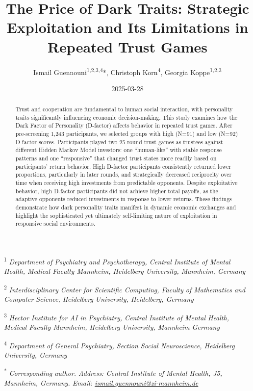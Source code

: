 \documentclass[
]{article}
\title{The Price of Dark Traits: Strategic Exploitation and Its Limitations in Repeated Trust Games}
\author{Ismail Guennouni\textsuperscript{1,2,3,4}*, Christoph Korn\textsuperscript{4}, Georgia Koppe\textsuperscript{1,2,3}}
\date{2025-03-28}
\begin{document}
\maketitle
\begin{abstract}
Trust and cooperation are fundamental to human social interaction, with personality traits significantly influencing economic decision-making. This study examines how the Dark Factor of Personality (D-factor) affects behavior in repeated trust games. After pre-screening 1,243 participants, we selected groups with high (N=91) and low (N=92) D-factor scores. Participants played two 25-round trust games as trustees against different Hidden Markov Model investors: one ``human-like'' with stable response patterns and one ``responsive'' that changed trust states more readily based on participants' return behavior. High D-factor participants consistently returned lower proportions, particularly in later rounds, and strategically decreased reciprocity over time when receiving high investments from predictable opponents. Despite exploitative behavior, high D-factor participants did not achieve higher total payoffs, as the adaptive opponents reduced investments in response to lower returns. These findings demonstrate how dark personality traits manifest in dynamic economic exchanges and highlight the sophisticated yet ultimately self-limiting nature of exploitation in responsive social environments.
\end{abstract}

\small

\textsuperscript{1} \emph{Department of Psychiatry and Psychotherapy, Central Institute of
Mental Health, Medical Faculty Mannheim, Heidelberg University,
Mannheim, Germany}

\textsuperscript{2} \emph{Interdisciplinary Center for Scientific Computing, Faculty of
Mathematics and Computer Science, Heidelberg University, Heidelberg,
Germany}

\textsuperscript{3} \emph{Hector Institute for AI in Psychiatry, Central Institute of Mental
Health, Medical Faculty Mannheim, Heidelberg University, Mannheim
Germany}

\textsuperscript{4} \emph{Department of General Psychiatry, Section Social Neuroscience,
Heidelberg University, Germany}

\textsuperscript{*} \emph{Corresponding author. Address: Central Institute of Mental Health,
J5, Mannheim, Germany. Email:
\href{mailto:ismail.guennouni@iwr.uni-heidelberg.de}{ismail.guennouni@zi-mannheim.de}}
\end{document}
